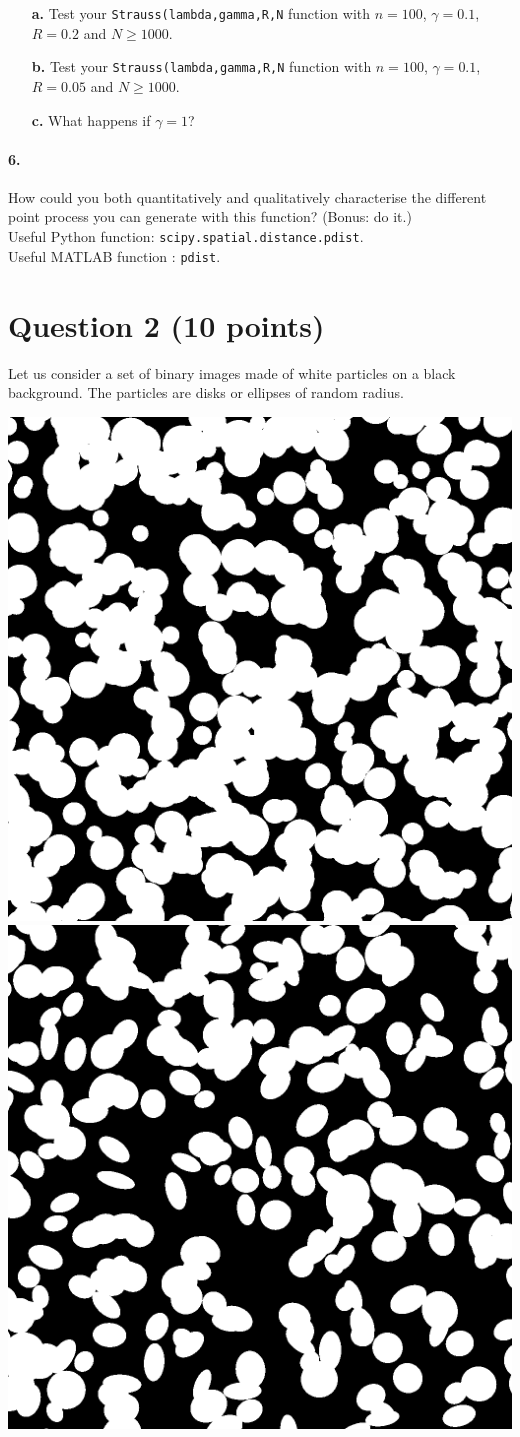 \documentclass{article}
\begin{document}
\begin{enumerate}
\item[\textbf{a.}] Test your \texttt{Strauss(lambda,gamma,R,N} function with $n=100$, $\gamma = 0.1$, $R=0.2$ and $N\geq 1000$.
\item[\textbf{b.}] Test your \texttt{Strauss(lambda,gamma,R,N} function with $n=100$, $\gamma = 0.1$, $R=0.05$ and $N\geq 1000$.
\item[\textbf{c.}] What happens if $\gamma = 1$?
\end{enumerate}

\paragraph{6.} How could you both  quantitatively and qualitatively characterise the different point process you can generate with this function? (Bonus: do it.)\\




Useful Python function: \texttt{scipy.spatial.distance.pdist}.\\

Useful MATLAB function	: \texttt{pdist}.




















\newpage

\section{Question 2 (10 points)}
Let us consider a set of binary images made of white particles on a black background. The particles are disks or ellipses of random radius.

\begin{center}
\includegraphics[width=.4\textwidth]{I_400_2.png}
\qquad
\includegraphics[width=.4\textwidth]{I_250_7.png}
\end{center}
\end{document}
